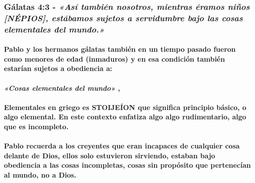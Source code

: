 \documentclass[11a pt,twoside]{article}
\newcommand{\scripture}[1]{%
  {\fontsize{12pt}{16pt}\selectfont\ScriptureFont\itshape #1}%
}
\let\oldsubsubsection\subsubsection
\renewcommand{\subsubsection}{\needspace{4\baselineskip}\oldsubsubsection}
\let\oldparagraph\paragraph
\renewcommand{\paragraph}{\needspace{3\baselineskip}\oldparagraph}
\begin{document}
\subsubsection{\texorpdfstring{Gálatas 4:3 -
\scripture{«Así también nosotros, mientras éramos niños [NÉPIOS], estábamos sujetos a servidumbre bajo las cosas elementales del mundo.»}}{Gálatas 4:3 - }}\label{guxe1latas-43---asuxed-tambiuxe9n-nosotros-mientras-uxe9ramos-niuxf1os-nuxe9pios-estuxe1bamos-sujetos-a-servidumbre-bajo-las-cosas-elementales-del-mundo.}

\paragraph{Pablo y los hermanos gálatas también en un tiempo pasado
fueron como menores de edad (inmaduros) y en esa condición también
estarían sujetos a obediencia
a:}\label{pablo-y-los-hermanos-guxe1latas-tambiuxe9n-en-un-tiempo-pasado-fueron-como-menores-de-edad-inmaduros-y-en-esa-condiciuxf3n-tambiuxe9n-estaruxedan-sujetos-a-obediencia-a}

\paragraph{\texorpdfstring{\scripture{«Cosas elementales del mundo»},}{,}}\label{cosas-elementales-del-mundo}

\paragraph{Elementales en griego es STOIJEÍON que significa principio
básico, o algo elemental. En este contexto enfatiza algo algo
rudimentario, algo que es
incompleto.}\label{elementales-en-griego-es-stoijeuxedon-que-significa-principio-buxe1sico-o-algo-elemental.-en-este-contexto-enfatiza-algo-algo-rudimentario-algo-que-es-incompleto.}

\paragraph{Pablo recuerda a los creyentes que eran incapaces de
cualquier cosa delante de Dios, ellos solo estuvieron sirviendo, estaban
bajo obediencia a las cosas incompletas, cosas sin propósito que
pertenecían al mundo, no a
Dios.}\label{pablo-recuerda-a-los-creyentes-que-eran-incapaces-de-cualquier-cosa-delante-de-dios-ellos-solo-estuvieron-sirviendo-estaban-bajo-obediencia-a-las-cosas-incompletas-cosas-sin-propuxf3sito-que-pertenecuxedan-al-mundo-no-a-dios.}
\end{document}
